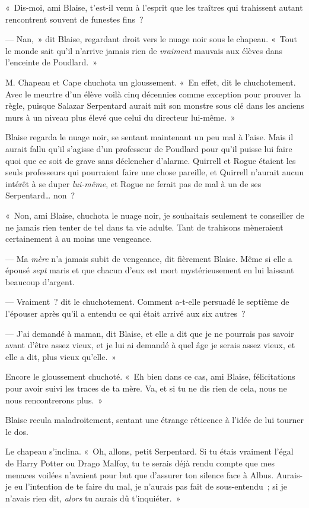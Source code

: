 «~Dis-moi, ami Blaise, t'est-il venu à l'esprit que les traîtres qui trahissent autant rencontrent souvent de funestes fins~?

--- Nan,~» dit Blaise, regardant droit vers le nuage noir sous le chapeau.
«~Tout le monde sait qu'il n'arrive jamais rien de \emph{vraiment} mauvais aux élèves dans l'enceinte de Poudlard.~»

M. Chapeau et Cape chuchota un gloussement.
«~En effet, dit le chuchotement.
Avec le meurtre d'un élève voilà cinq décennies comme exception pour prouver la règle, puisque Salazar Serpentard aurait mit son monstre sous clé dans les anciens murs à un niveau plus élevé que celui du directeur lui-même.~»

Blaise regarda le nuage noir, se sentant maintenant un peu mal à l'aise.
Mais il aurait fallu qu'il s'agisse d'un professeur de Poudlard pour qu'il puisse lui faire quoi que ce soit de grave sans déclencher d'alarme.
Quirrell et Rogue étaient les seuls professeurs qui pourraient faire une chose pareille, et Quirrell n'aurait aucun intérêt à se duper \emph{lui-même}, et Rogue ne ferait pas de mal à un de ses Serpentard… non~?

«~Non, ami Blaise, chuchota le nuage noir, je souhaitais seulement te conseiller de ne jamais rien tenter de tel dans ta vie adulte.
Tant de trahisons mèneraient certainement à au moins une vengeance.

--- Ma \emph{mère} n'a jamais subit de vengeance, dit fièrement Blaise.
Même si elle a épousé \emph{sept} maris et que chacun d'eux est mort mystérieusement en lui laissant beaucoup d'argent.

--- Vraiment~? dit le chuchotement.
Comment a-t-elle persuadé le septième de l'épouser après qu'il a entendu ce qui était arrivé aux six autres~?

--- J'ai demandé à maman, dit Blaise, et elle a dit que je ne pourrais pas savoir avant d'être assez vieux, et je lui ai demandé à quel âge je serais assez vieux, et elle a dit, plus vieux qu'elle.~»

Encore le gloussement chuchoté.
«~Eh bien dans ce cas, ami Blaise, félicitations pour avoir suivi les traces de ta mère.
Va, et si tu ne dis rien de cela, nous ne nous rencontrerons plus.~»

Blaise recula maladroitement, sentant une étrange réticence à l'idée de lui tourner le dos.

Le chapeau s'inclina.
«~Oh, allons, petit Serpentard.
Si tu étais vraiment l'égal de Harry Potter ou Drago Malfoy, tu te serais déjà rendu compte que mes menaces voilées n'avaient pour but que d'assurer ton silence face à Albus.
Aurais-je eu l'intention de te faire du mal, je n'aurais pas fait de sous-entendu~; si je n'avais rien dit, \emph{alors} tu aurais dû t'inquiéter.~»

